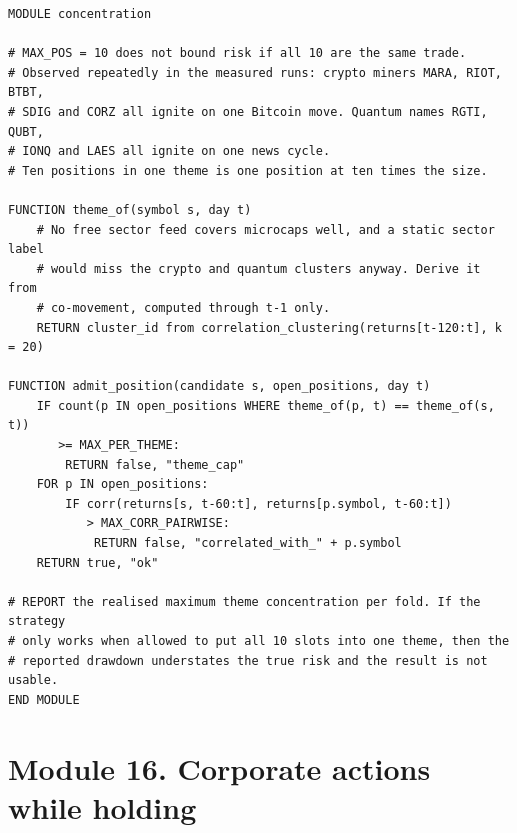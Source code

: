 \documentclass[10pt]{article}
\begin{document}
\begin{lstlisting}
MODULE concentration

# MAX_POS = 10 does not bound risk if all 10 are the same trade.
# Observed repeatedly in the measured runs: crypto miners MARA, RIOT, BTBT,
# SDIG and CORZ all ignite on one Bitcoin move. Quantum names RGTI, QUBT,
# IONQ and LAES all ignite on one news cycle.
# Ten positions in one theme is one position at ten times the size.

FUNCTION theme_of(symbol s, day t)
    # No free sector feed covers microcaps well, and a static sector label
    # would miss the crypto and quantum clusters anyway. Derive it from
    # co-movement, computed through t-1 only.
    RETURN cluster_id from correlation_clustering(returns[t-120:t], k = 20)

FUNCTION admit_position(candidate s, open_positions, day t)
    IF count(p IN open_positions WHERE theme_of(p, t) == theme_of(s, t))
       >= MAX_PER_THEME:
        RETURN false, "theme_cap"
    FOR p IN open_positions:
        IF corr(returns[s, t-60:t], returns[p.symbol, t-60:t])
           > MAX_CORR_PAIRWISE:
            RETURN false, "correlated_with_" + p.symbol
    RETURN true, "ok"

# REPORT the realised maximum theme concentration per fold. If the strategy
# only works when allowed to put all 10 slots into one theme, then the
# reported drawdown understates the true risk and the result is not usable.
END MODULE
\end{lstlisting}

\section{Module 16. Corporate actions while holding}
\end{document}
